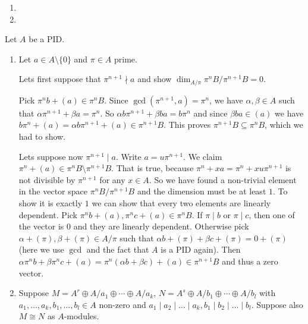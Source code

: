 \begin{exercise}{3}
    \begin{enumerate}
        \item 
        \item
    \end{enumerate}
\end{exercise}

\begin{exercise}{4}
    Let $A$ be a PID.
    \begin{enumerate}
        \item Let $a \in A \setminus \{0\}$ and $\pi \in A$ prime.

            Lets first suppose that $\pi^{n+1} \nmid a$ and show
            $\dim_{A/\pi} \pi^n B / \pi^{n+1} B = 0$.

            Pick $\pi^n b + (a) \in \pi^n B$. Since $\gcd(\pi^{n+1}, a) =
            \pi^n$, we have $\alpha, \beta \in A$ such that $\alpha \pi^{n+1} +
            \beta a = \pi^n$. So $\alpha b \pi^{n+1} + \beta b a = b \pi^n$ and
            since $\beta b a \in (a)$ we have $b \pi^n + (a) = \alpha b
            \pi^{n+1} + (a) \in \pi^{n+1} B$. This proves $\pi^{n+1} B \subseteq
            \pi^n B$, which we had to show.

            Lets suppose now $\pi^{n+1} \mid a$. Write $a = u \pi^{n+1}$. We
            claim $\pi^n + (a) \in \pi^n B \setminus \pi^{n+1} B$. That is true,
            because $\pi^n + x a = \pi^n + x u \pi^{n+1}$ is not divisible by
            $\pi^{n+1}$ for any $x \in A$. So we have found a non-trivial
            element in the vector space $\pi^n B / \pi^{n+1} B$ and the
            dimension must be at least $1$. To show it is exactly $1$ we can
            show that every two elements are linearly dependent. Pick $\pi^n b +
            (a), \pi^n c + (a) \in \pi^n B$. If $\pi \mid b$ or $\pi \mid c$,
            then one of the vector is $0$ and they are linearly dependent.
            Otherwise pick $\alpha + (\pi), \beta + (\pi) \in A/\pi$ such that
            $\alpha b + (\pi) + \beta c + (\pi) = 0 + (\pi)$ (here we use
            $\gcd{}$ and the fact that $A$ is a PID again). Then $\alpha \pi^n b
            + \beta \pi^n c + (a) = \pi^n (\alpha b + \beta c) + (a) \in
            \pi^{n+1} B$ and thus a zero vector.
        \item Suppose $M = A^r \oplus A / a_1 \oplus \cdots \oplus A / a_k$, $N
            = A^s \oplus A / b_1 \oplus \cdots \oplus A / b_l$ with $a_1,
            \ldots, a_k, b_1, \ldots, b_l \in A$ non-zero and $a_1 \mid a_2 \mid
            \ldots \mid a_k, b_1 \mid b_2 \mid \ldots \mid b_l$. Suppose also $M
            \cong N$ as $A$-modules.


\end{enumerate}
\end{exercise}
